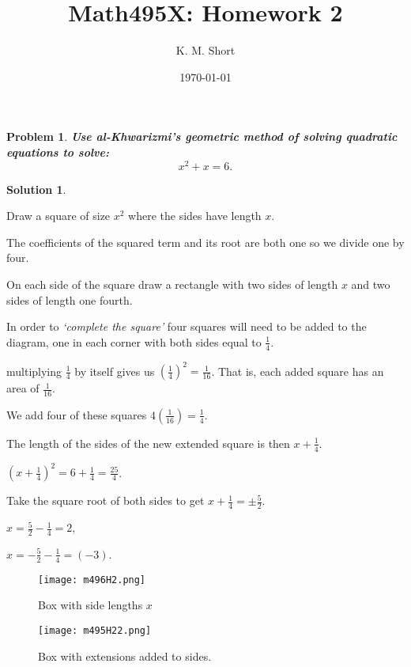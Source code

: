 \documentclass[10pt]{article}
\author{K. M. Short}
\title{Math495X: Homework 2}
\date{\today}
\theoremstyle{plain}
\theoremstyle{definition}
\newtheorem{prob}{Problem}
\newtheorem*{sol}{Solution}
\theoremstyle{remark}
\begin{document}
\begin{prob}
\textbf{\textit{Use al-Khwarizmi's geometric method of solving quadratic equations to solve:}} \[x^2+ x = 6.\]
\end{prob}

\medskip 

\begin{sol}

\end{sol}

\medskip 

\begin{description}
\item Draw a square of size $x^2$ where the sides have length $x$.
\item The coefficients of the squared term and its root are both one so we divide one by four. 
\item On each side of the square draw a rectangle with two sides of length $x$ and two sides of length one fourth.
\item In order to \textit{‘complete the square’} four squares will need to be added to the diagram, one in each corner with both sides equal to $\frac{1}{4}$.
\item multiplying $\frac{1}{4}$ by itself gives us  $(\frac{1}{4})^2 = \frac{1}{16}$. That is, each added square has an area of $ \frac{1}{16}$.
\item We add four of these squares $4( \frac{1}{16}) = \frac{1}{4}$.
\item The length of the sides of the new extended square is then $x + \frac{1}{4}$.
\item $(x+\frac{1}{4})^2 = 6+\frac{1}{4} = \frac{25}{4}$.
\item Take the square root of both sides to get $x+\frac{1}{4} = \pm \frac{5}{2}$.
\item $x = \frac{5}{2} - \frac{1}{4} = 2$,
\item $x = - \frac{5}{2} - \frac{1}{4} = (-3)$.
\end{description}

\medskip

\begin{figure}[ht]
\begin{center}
\texttt{[image: m496H2.png]}
\end{center}
\caption{Box with side lengths $x$}
\end{figure}

\smallskip

\begin{figure}[ht]
\begin{center}
\texttt{[image: m495H22.png]}
\end{center}
\caption{Box with extensions added to sides.}
\end{figure}
\end{document}
